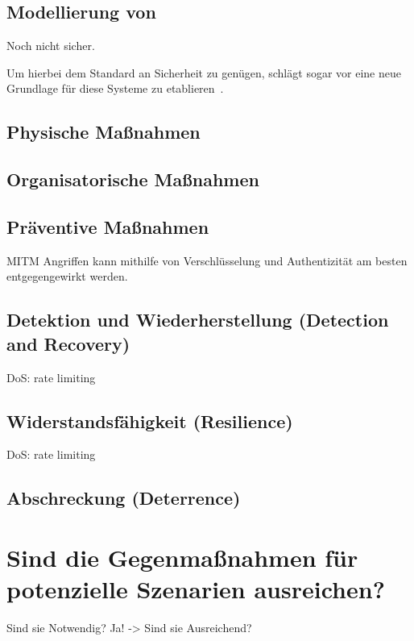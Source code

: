 \documentclass[final,bibliography=totocnumbered]{include/sikseminar}
\begin{document}

\subsection{Modellierung von }\label{subsec:modellierung}
Noch nicht sicher.

Um hierbei dem Standard an Sicherheit zu genügen, schlägt \citeauthor{Lee08} sogar vor eine neue Grundlage für diese Systeme zu etablieren~\cite{Lee08}.

\subsection{Physische Maßnahmen}\label{subsec:physisch}

\subsection{Organisatorische Maßnahmen}\label{subsec:orga}

\subsection{Präventive Maßnahmen}\label{subsec:präventiv}

MITM Angriffen kann mithilfe von Verschlüsselung und Authentizität am besten entgegengewirkt werden.

\subsection{Detektion und Wiederherstellung (Detection and Recovery)}\label{subsec:detektion}
DoS: rate limiting

\subsection{Widerstandsfähigkeit (Resilience)}\label{subsec:widerstand} %

DoS: rate limiting

\subsection{Abschreckung (Deterrence)}\label{subsec:abschreckung} %

\section{Sind die Gegenmaßnahmen für potenzielle Szenarien ausreichen?}\label{sec:diskussion}

Sind sie Notwendig?
Ja! -> Sind sie Ausreichend?


\newpage
\printglossary[type=\acronymtype]
~\nocite{*}

\printbibliography
\newpage
\end{document}
